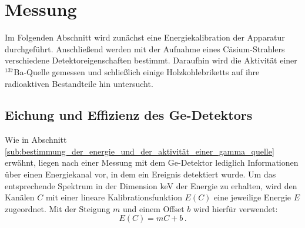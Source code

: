 \section{Messung}
\label{sec:messung}
Im Folgenden Abschnitt wird zunächst eine Energiekalibration der Apparatur
durchgeführt. Anschließend werden mit der Aufnahme eines Cäsium-Strahlers
verschiedene Detektoreigenschaften bestimmt.
Daraufhin wird die Aktivität einer $^{137}$Ba-Quelle gemessen und schließlich einige
Holzkohlebriketts auf ihre radioaktiven Bestandteile hin untersucht.

\subsection{Eichung und Effizienz des Ge-Detektors}
\label{subse:eichung}
Wie in Abschnitt \ref{sub:bestimmung_der_energie_und_der_aktivität_einer_gamma_quelle}
erwähnt, liegen nach einer Messung mit dem Ge-Detektor lediglich Informationen
über einen Energiekanal vor, in dem ein Ereignis detektiert wurde.
Um das entsprechende Spektrum in der Dimension \si{keV} der Energie zu erhalten,
wird den Kanälen $C$ mit einer lineare Kalibrationsfunktion $E(C)$ eine jeweilige
Energie $E$ zugeordnet.
Mit der Steigung $m$ und einem Offset $b$ wird hierfür verwendet:%
%
\begin{equation}
    \label{eqn:kalibration}
    E(C) = mC + b\,.
\end{equation}

